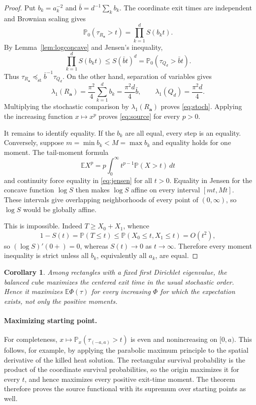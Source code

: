 \documentclass[10pt]{article}
\newtheorem{corollary}{Corollary}
\newcommand{\E}{\mathbb E}
\newcommand{\Pp}{\mathbb P}
\newcommand{\st}{\preceq_{\mathrm{st}}}
\begin{document}
\begin{proof}
Put $b_k=a_k^{-2}$ and $\bar b=d^{-1}\sum_kb_k$.  The coordinate exit times
are independent and Brownian scaling gives
\[
 \Pp_0(\tau_{R_{\mathbf a}}>t)=\prod_{k=1}^dS(b_kt).
\]
By Lemma~\ref{lem:logconcave} and Jensen's inequality,
\begin{equation}\label{eq:jensen}
 \prod_{k=1}^dS(b_kt)
 \le S(\bar bt)^d
 =\Pp_0(\tau_{Q_d}>\bar bt).
\end{equation}
Thus $\tau_{R_{\mathbf a}}\st \bar b^{-1}\tau_{Q_d}$.  On the other hand,
separation of variables gives
\[
 \lambda_1(R_{\mathbf a})=\frac{\pi^2}{4}\sum_{k=1}^db_k
 =\frac{\pi^2d}{4}\bar b,
 \qquad \lambda_1(Q_d)=\frac{\pi^2d}{4}.
\]
Multiplying the stochastic comparison by $\lambda_1(R_{\mathbf a})$ proves
\eqref{eq:stoch}.  Applying the increasing function $x\mapsto x^p$ proves
\eqref{eq:source} for every $p>0$.

It remains to identify equality.  If the $b_k$ are all equal, every step is
an equality.  Conversely, suppose $m=\min b_k<M=\max b_k$ and equality holds
for one moment.  The tail-moment formula
\[
 \E X^p=p\int_0^{\infty}t^{p-1}\Pp(X>t)\,dt
\]
and continuity force equality in \eqref{eq:jensen} for all $t>0$.  Equality
in Jensen for the concave function $\log S$ then makes $\log S$ affine on
every interval $[mt,Mt]$.  These intervals give overlapping neighborhoods of
every point of $(0,\infty)$, so $\log S$ would be globally affine.

This is impossible.  Indeed $T\ge X_0+X_1$, whence
\[
 1-S(t)=\Pp(T\le t)\le \Pp(X_0\le t,X_1\le t)=O(t^2),
\]
so $(\log S)'(0+)=0$, whereas $S(t)\to0$ as $t\to\infty$.  Therefore every
moment inequality is strict unless all $b_k$, equivalently all $a_k$, are
equal.
\end{proof}

\begin{corollary}
Among rectangles with a fixed first Dirichlet eigenvalue, the balanced cube
maximizes the centered exit time in the usual stochastic order.  Hence it
maximizes $\E\Phi(\tau)$ for every increasing $\Phi$ for which the expectation
exists, not only the positive moments.
\end{corollary}

\paragraph{Maximizing starting point.}
For completeness, $x\mapsto\Pp_x(\tau_{(-a,a)}>t)$ is even and nonincreasing
on $[0,a)$.  This follows, for example, by applying the parabolic maximum
principle to the spatial derivative of the killed heat solution.  The
rectangular survival probability is the product of the coordinate survival
probabilities, so the origin maximizes it for every $t$, and hence maximizes
every positive exit-time moment.  The theorem therefore proves the source
functional with its supremum over starting points as well.
\end{document}
